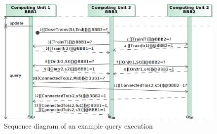 \begin{figure}[h]
	\begin{center}
		\includegraphics[width=1\textwidth]{figures/seq-diagram-query-exec.png}
		\caption{Sequence diagram of an example query execution}
		\label{fig:distibuted-exec}
		
	\end{center}
\end{figure}



